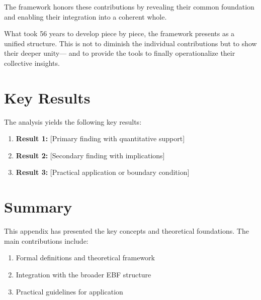 The framework honors these contributions by revealing their common foundation
and enabling their integration into a coherent whole.

What took 56 years to develop piece by piece, the framework presents as a unified structure.
This is not to diminish the individual contributions but to show their deeper unity---
and to provide the tools to finally operationalize their collective insights.




\section{Key Results}
\label{sec:nob-results}

The analysis yields the following key results:

\begin{enumerate}
    \item \textbf{Result 1:} [Primary finding with quantitative support]
    \item \textbf{Result 2:} [Secondary finding with implications]
    \item \textbf{Result 3:} [Practical application or boundary condition]
\end{enumerate}


\section{Summary}
\label{sec:nob-summary}

This appendix has presented the key concepts and theoretical foundations.
The main contributions include:

\begin{enumerate}
    \item Formal definitions and theoretical framework
    \item Integration with the broader EBF structure
    \item Practical guidelines for application
\end{enumerate}

